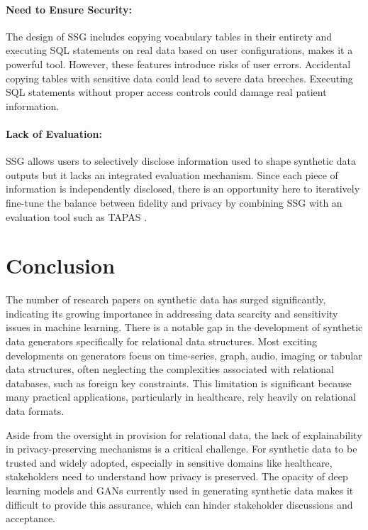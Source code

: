 \documentclass[11pt]{article}
\begin{document}
\paragraph{Need to Ensure Security:} The design of SSG includes copying vocabulary tables in their entirety and executing SQL statements on real data based on user configurations, makes it a powerful tool. However, these features introduce risks of user errors. Accidental copying tables with sensitive data could lead to severe data breeches. Executing SQL statements without proper access controls could damage real patient information.

\paragraph{Lack of Evaluation:} SSG allows users to selectively disclose information used to shape synthetic data outputs but it lacks an integrated evaluation mechanism. Since each piece of information is independently disclosed, there is an opportunity here to iteratively fine-tune the balance between fidelity and privacy by combining SSG with an evaluation tool such as TAPAS \cite{houssiau2022tapas}.

\section{Conclusion}

The number of research papers on synthetic data has surged significantly, indicating its growing importance in addressing data scarcity and sensitivity issues in machine learning. There is a notable gap in the development of synthetic data generators specifically for relational data structures. Most exciting developments on generators focus on time-series, graph, audio, imaging or tabular data structures, often neglecting the complexities associated with relational databases, such as foreign key constraints. This limitation is significant because many practical applications, particularly in healthcare, rely heavily on relational data formats. 

Aside from the oversight in provision for relational data, the lack of explainability in privacy-preserving mechanisms is a critical challenge. For synthetic data to be trusted and widely adopted, especially in sensitive domains like healthcare, stakeholders need to understand how privacy is preserved. The opacity of deep learning models and GANs currently used in generating synthetic data makes it difficult to provide this assurance, which can hinder stakeholder discussions and acceptance.
\end{document}
